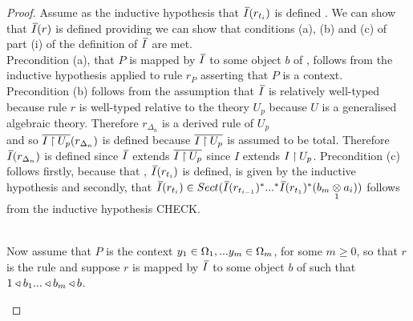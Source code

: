 \begin{proof}
\noindent Assume as the inductive hypothesis that $\Ibar(r_{t_i})$ is defined \foreachi. We can show that $\Ibar(r)$ is defined providing we can show that conditions (a), (b) and (c) of part (i) of the definition of $\Ibar$ are met. \\
\noindent Precondition (a), that $P$ is mapped by $\Ibar$ to some object $b$  of \catc, follows from the inductive hypothesis applied to  rule $r_P$ asserting that $P$ is a context.  \\
\noindent Precondition (b) follows from the assumption that $\Ibar$ is relatively well-typed because rule $r$ is well-typed relative to the theory
$U_p$ because $U$ is a generalised algebraic theory. 
\noindent Therefore $r_{\Delta_n}$ is a derived rule of $U_p$\\ and so $\overline{I \mathbin{\restriction} U_p}(r_{\Delta_n})$ is defined  because $\overline{I \mathbin{\restriction} U_p}$ is assumed to be total. 
Therefore $\Ibar(r_{\Delta_n})$ is defined since
$\Ibar$ extends $\overline{I \mathbin{\restriction} U_p}$ since $I$ extends $I \mathbin{\restriction} U_p$. 
\noindent  Precondition (c) follows firstly, because that \foreachi, $\Ibar(r_{t_i})$ is defined, is given by the inductive hypothesis and 
secondly, that $\Ibar(r_{t_i}) \in Sect(\Ibar(r_{t_{i-1}})^*...^*\Ibar(r_{t_{1}})^*(\crossx{b_m}{a_i}{1}))$ follows  from 
the inductive hypothesis {CHECK}.\\

\begin{newtt}
                                                               \\

\newcommand{\clausethreelhs}{(\gmvectorstar (\crossx{c}{f_n}{1}))^* ... (\gmvectorstar (\crossx{c}{f_1}{1})) ^* (\crossx{b_m}{I_A}{1})}
\newcommand{\clausethreerhs}{\gmvectorstar (  \crossx{c}{(\fnvectorstar(\crossx{b_m}{I_A}{1}))}{1} )}
\newcommand{\tirule}{\gatdisplayrule{\yOmega{m}}{\ofT{t_i}{\Delta_i[t_1 | x_1,...t_{i-1}|x_{i-1}]}}}
Now assume that $P$ is the context $y_1 \in \Omega_1,... y_{m} \in \Omega_{m}$, for some $m \geq 0$, so that $r$ is the rule 
and suppose $r$  is mapped by $\Ibar$ to some object $b$ of \catcw such that $1 \triangleleft b_1 ... \triangleleft b_m \triangleleft b$. 


\end{newtt}
\end{proof}
